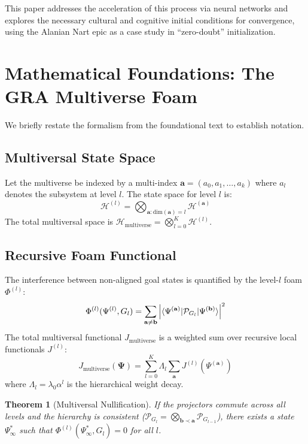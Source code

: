 \documentclass[11pt]{article}
\newtheorem{theorem}{Theorem}[section]
\newcommand{\pena}{\Phi}
\newcommand{\proj}{\mathcal{P}}
\newcommand{\metagoal}{G}
\newcommand{\universe}{\mathcal{H}}
\newcommand{\multindex}{\mathbf{a}}
\newcommand{\state}{\Psi}
\newcommand{\param}{\Lambda}
\newcommand{\vacuum}{\state_{\infty}^*}
\begin{document}
This paper addresses the acceleration of this process via neural networks and explores the necessary cultural and cognitive initial conditions for convergence, using the Alanian Nart epic as a case study in ``zero-doubt'' initialization.

\section{Mathematical Foundations: The GRA Multiverse Foam}
We briefly restate the formalism from the foundational text to establish notation.

\subsection{Multiversal State Space}
Let the multiverse be indexed by a multi-index \(\multindex = (a_0, a_1, \dots, a_k)\) where \(a_l\) denotes the subsystem at level \(l\). The state space for level \(l\) is:
\begin{equation}
\universe^{(l)} = \bigotimes_{\multindex: \text{dim}(\multindex)=l} \universe^{(\multindex)}
\end{equation}
The total multiversal space is \(\universe_{\text{multiverse}} = \bigotimes_{l=0}^K \universe^{(l)}\).

\subsection{Recursive Foam Functional}
The interference between non-aligned goal states is quantified by the level-\(l\) foam \(\pena^{(l)}\):
\begin{equation}
\pena^{(l)}(\state^{(l)}, \metagoal_l) = \sum_{\multindex \neq \mathbf{b}} \left| \braket{\state^{(\multindex)} | \proj_{\metagoal_l} | \state^{(\mathbf{b})}} \right|^2
\end{equation}
The total multiversal functional \(J_{\text{multiverse}}\) is a weighted sum over recursive local functionals \(J^{(l)}\):
\begin{equation}
J_{\text{multiverse}}(\bm{\state}) = \sum_{l=0}^K \param_l \sum_{\multindex} J^{(l)}(\state^{(\multindex)})
\end{equation}
where \(\param_l = \lambda_0 \alpha^l\) is the hierarchical weight decay.

\begin{theorem}[Multiversal Nullification]
If the projectors commute across all levels and the hierarchy is consistent (\(\proj_{G_l} = \bigotimes_{\mathbf{b} \prec \multindex} \proj_{G_{l-1}}\)), there exists a state \(\vacuum\) such that \(\pena^{(l)}(\vacuum, \metagoal_l) = 0\) for all \(l\).
\end{theorem}
\end{document}
